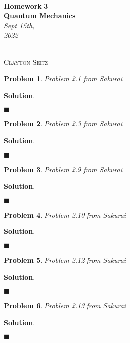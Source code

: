 \documentclass[12pt]{article}
\newtheorem{p}{Problem}
\theoremstyle{definition}
\newenvironment{s}{%
        \begin{trivlist} \item \textbf{Solution}. }{%
            \hspace*{\fill} $\blacksquare$\end{trivlist}}%
\begin{document}
 {\noindent\Huge\bf  \\[0.5\baselineskip] {\selectfont  Homework 3}         }\\[2\baselineskip] %
{ {\bf {}\selectfont Quantum Mechanics}\\ {\textit{\selectfont     Sept 15th, 2022}}}~~~~~~~~~~~~~~~~~~~~~~~~~~~~~~~~~~~~~~~~~~~~~~~~~~~~~~~~~~~~~~~~~~~~~~~~~~~~~    {\large \textsc{Clayton Seitz}
\\[1.4\baselineskip] 

\begin{p}
Problem 2.1 from Sakurai
\end{p}

\begin{s}

\end{s}

\begin{p}
Problem 2.3 from Sakurai
\end{p}

\begin{s}

\end{s}

\begin{p}
Problem 2.9 from Sakurai
\end{p}

\begin{s}

\end{s}

\begin{p}
Problem 2.10 from Sakurai
\end{p}

\begin{s}

\end{s}

\begin{p}
Problem 2.12 from Sakurai
\end{p}

\begin{s}

\end{s}

\begin{p}
Problem 2.13 from Sakurai
\end{p}

\begin{s}

\end{s}
\end{document}

